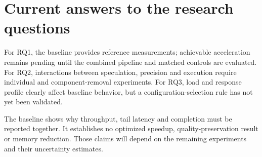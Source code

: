 

\section{Current answers to the research questions}
For RQ1, the baseline provides reference measurements; achievable acceleration remains pending until the combined pipeline and matched controls are evaluated. For RQ2, interactions between speculation, precision and execution require individual and component-removal experiments. For RQ3, load and response profile clearly affect baseline behavior, but a configuration-selection rule has not yet been validated.

The baseline shows why throughput, tail latency and completion must be reported together. It establishes no optimized speedup, quality-preservation result or memory reduction. Those claims will depend on the remaining experiments and their uncertainty estimates.
